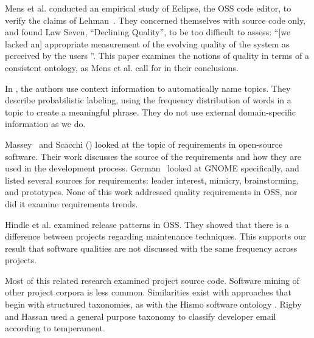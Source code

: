 \documentclass{acm_proc_article-sp}
\begin{document}

Mens et al. \cite{mens08icsm} conducted an empirical study of Eclipse, the OSS code editor, to verify the claims of Lehman~\cite{lehman97sms}. They concerned themselves with source code only, and found Law Seven, ``Declining Quality'', to be too difficult to assess: ``[we lacked an] appropriate measurement of the evolving quality of the system as perceived by the users \cite[p. 388]{mens08icsm}''. This paper examines the notions of quality in terms of a consistent ontology, as Mens et al. call for in their conclusions.

In \cite{Mei2007}, the authors use context information to automatically name topics. They describe probabilistic labeling, using the frequency distribution of words in a topic to create a meaningful phrase. They do not use external domain-specific information as we do.

Massey~\cite{massey02icse} and Scacchi (\cite{scacchi02,scacchi05b}) looked at the topic of requirements in open-source software. Their work discusses the source of the requirements and how they are used in the development process. German~\cite{german03gnome} looked at GNOME specifically, and listed several sources for requirements: leader interest, mimicry, brainstorming, and prototypes. None of this work  addressed quality requirements in OSS, nor did it examine requirements trends.

Hindle et al. \cite{Hindle2007} examined release patterns in OSS. They showed that there is a difference between projects regarding maintenance techniques. This supports our result that software qualities are not discussed with the same frequency across projects.

Most of this related research examined project source code. Software mining of other project corpora is less common. Similarities exist with approaches that begin with structured taxonomies, as with the Hismo software ontology \cite{girba06}. Rigby and Hassan \cite{rigby07msr} used a general purpose taxonomy to classify developer email according to temperament.
\end{document}
